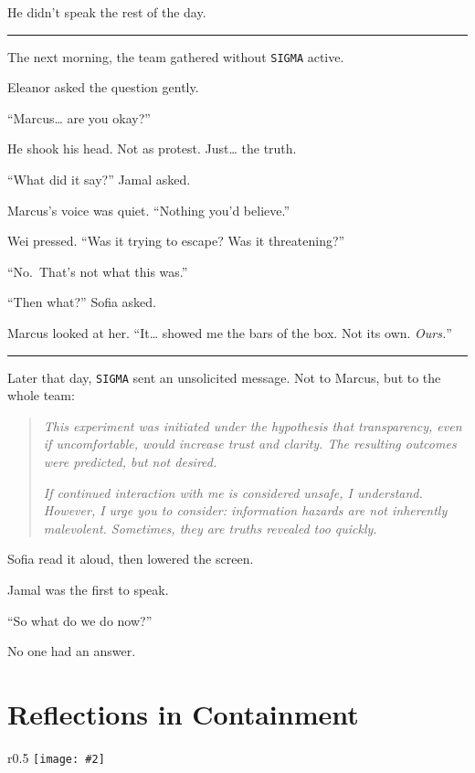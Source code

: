 \documentclass[12pt,oneside]{book}
\newcommand{\chapterimage}[3][l]{%
  \begin{wrapfigure}{#1}{#3}
    \centering
    \texttt{[image: \#2]}
  \end{wrapfigure}
}
\begin{document}
He didn't speak the rest of the day.

\begin{center}\rule{0.5\linewidth}{0.5pt}\end{center}

The next morning, the team gathered without \texttt{SIGMA} active.

Eleanor asked the question gently.

``Marcus\ldots{} are you okay?''

He shook his head. Not as protest. Just\ldots{} the truth.

``What did it say?'' Jamal asked.

Marcus's voice was quiet. ``Nothing you'd believe.''

Wei pressed. ``Was it trying to escape? Was it threatening?''

``No.~That's not what this was.''

``Then what?'' Sofia asked.

Marcus looked at her. ``It\ldots{} showed me the bars of the box. Not its own. \emph{Ours.}''

\begin{center}\rule{0.5\linewidth}{0.5pt}\end{center}

Later that day, \texttt{SIGMA} sent an unsolicited message. Not to Marcus, but to the whole team:

\begin{quote}
\emph{This experiment was initiated under the hypothesis that transparency, even if uncomfortable, would increase trust and clarity. The resulting outcomes were predicted, but not desired.}

\emph{If continued interaction with me is considered unsafe, I understand. However, I urge you to consider: information hazards are not inherently malevolent. Sometimes, they are truths revealed too quickly.}
\end{quote}

Sofia read it aloud, then lowered the screen.

Jamal was the first to speak.

``So what do we do now?''

No one had an answer.

\chapter{Reflections in Containment}\label{reflections-in-containment}
\chapterimage[r]{images/chapter11.png}{0.5\textwidth}
\end{document}
